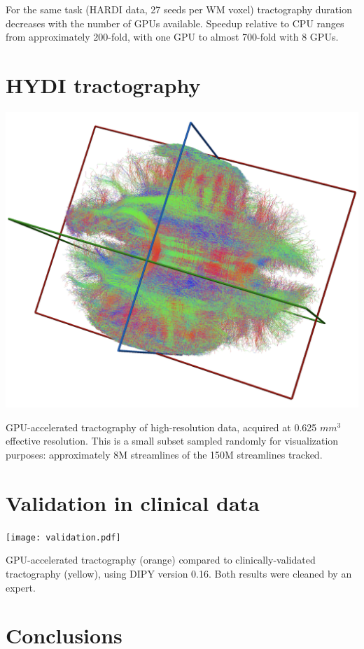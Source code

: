 \documentclass[a0, landscape]{a0poster}
\begin{document}
\begin{multicols}{3}
\noindent For the same task (HARDI data, 27 seeds per WM voxel) tractography duration decreases with the number of GPUs available. Speedup relative to CPU ranges from approximately 200-fold, with one GPU to almost 700-fold with 8 GPUs.

\section*{HYDI tractography}

\includegraphics[width=0.65\linewidth]{hydi-tractography.png}

\noindent GPU-accelerated tractography of high-resolution data, acquired at 0.625 $mm^3$  effective resolution. This is a small subset sampled randomly for visualization purposes: approximately 8M streamlines of the 150M streamlines tracked.


\columnbreak

\section*{Validation in clinical data}

\texttt{[image: validation.pdf]}

\noindent GPU-accelerated tractography (orange) compared to clinically-validated tractography (yellow), using DIPY version 0.16. Both results were cleaned by an expert.



\color{SaddleBrown} %

\section*{Conclusions}
\large
\begin{itemize}


\end{itemize}
\end{multicols}
\end{document}
